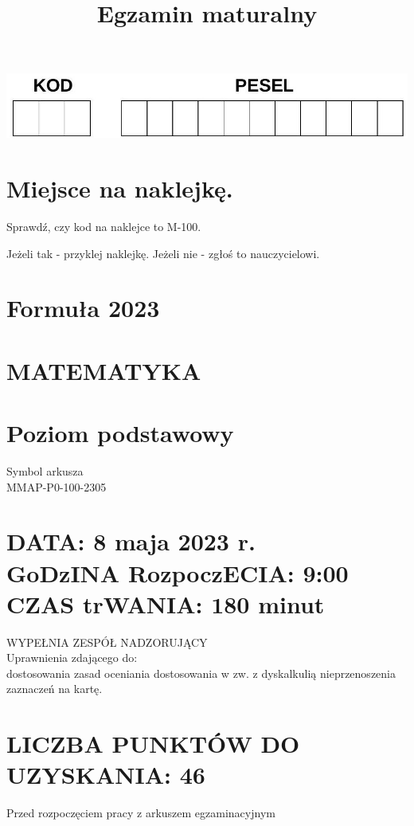 \documentclass[10pt]{article}
\title{Egzamin maturalny }
\author{}
\date{}
\begin{document}
\maketitle
\begin{center}
\includegraphics[max width=\textwidth]{2024_11_21_51cb67544fb9b029f01cg-01}
\end{center}

\section*{Miejsce na naklejkę.}
Sprawdź, czy kod na naklejce to M-100.

Jeżeli tak - przyklej naklejkę. Jeżeli nie - zgłoś to nauczycielowi.

\section*{Formuła 2023}
\section*{MATEMATYKA}
\section*{Poziom podstawowy}
Symbol arkusza\\
MMAP-P0-100-2305

\section*{DATA: 8 maja 2023 r. \\
 GoDzINA RozpoczECIA: 9:00 \\
 CZAS trWANIA: \(\mathbf{1 8 0}\) minut}
WYPEŁNIA ZESPÓŁ NADZORUJĄCY\\
Uprawnienia zdającego do:\\
dostosowania zasad oceniania dostosowania w zw. z dyskalkulią nieprzenoszenia zaznaczeń na kartę.

\section*{LICZBA PUNKTÓW DO UZYSKANIA: 46}
Przed rozpoczęciem pracy z arkuszem egzaminacyjnym
\end{document}
